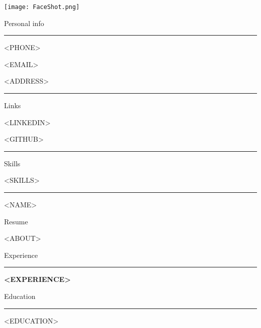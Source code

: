 \documentclass{letter}
\begin{document}
\begin{minipage}[t]{0.40\textwidth}
\setlength{\baselineskip}{1.5\baselineskip}
\color{white}
\vspace{1cm}

\texttt{[image: FaceShot.png]}

{\large Personal info}

\rule{\linewidth}{0.4pt}

\faPhone \quad <PHONE>


\faEnvelope \quad <EMAIL>


\faMapMarker \quad <ADDRESS>

\rule{\linewidth}{0.4pt}

{\large Links}

\faCode \quad <LINKEDIN>

\faGithub \quad <GITHUB>

\rule{\linewidth}{0.4pt}

{\large Skills}
\begin{itemize}
<SKILLS>
\end{itemize}



\rule{\linewidth}{0.4pt}


\end{minipage}
\hfill
\begin{minipage}[t]{0.60\textwidth}
\setlength{\baselineskip}{1.5\baselineskip}
\vspace{0.8cm}
{\huge <NAME>}

{\large Resume}

\vspace{0.5cm}
 
<ABOUT>

\vspace{0.5cm}

{\large Experience}
\rule{\linewidth}{0.4pt}

{\large \textbf{<EXPERIENCE>}}

{\large Education}
\rule{\linewidth}{0.4pt}
\begin{itemize}
<EDUCATION>
\end{itemize}



\end{minipage}
\end{document}
